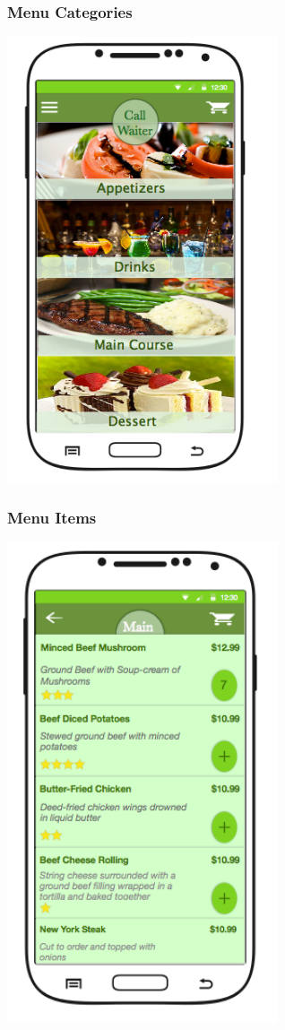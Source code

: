 \documentclass[12pt, titlepage]{article}
\begin{document}
\subsubsection{Menu Categories}
\includegraphics[width=80mm,scale=0.5]{MenuCategories.png}

\subsubsection{Menu Items}
\includegraphics[width=80mm,scale=0.5]{CategoryItems.png}
\end{document}
